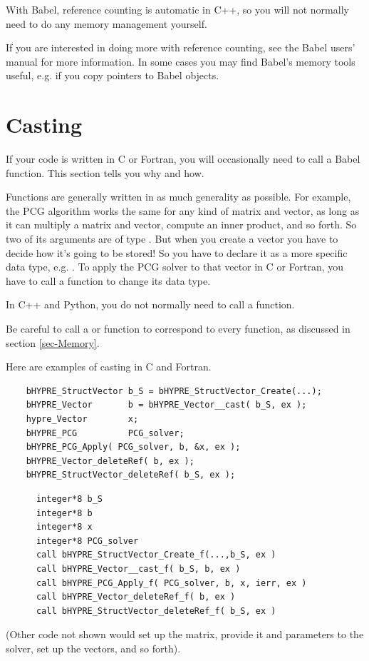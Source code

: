 With Babel, reference counting is automatic in C++, so you will not
normally need to do any memory management yourself.

If you are interested in doing more with reference counting, see the
Babel users' manual for more information.  In some cases you may find
Babel's memory tools useful, e.g. if you copy pointers to Babel
objects.


\section{Casting}
\label{sec-Casting}

If your code is written in C or Fortran, you will occasionally need to
call a Babel  function.  This section tells you why and
how.

Functions are generally written in as much generality as possible.
For example, the PCG algorithm works the same for any kind of matrix
and vector, as long as it can multiply a matrix and vector, compute an
inner product, and so forth.  So two of its arguments are of type
.  But when you create a vector you have to decide
how it's going to be stored!  So you have to declare it as a more
specific data type, e.g. .  To apply the PCG
solver to that vector in C or Fortran, you have to call a 
function to change its data type.

In C++ and Python, you do not normally need to call a 
function.

Be careful to call a  or  function to
correspond to every  function, as discussed in section
\ref{sec-Memory}.

Here are examples of casting in C and Fortran.
\begin{verbatim}
    bHYPRE_StructVector b_S = bHYPRE_StructVector_Create(...);
    bHYPRE_Vector       b = bHYPRE_Vector__cast( b_S, ex );
    hypre_Vector        x;
    bHYPRE_PCG          PCG_solver;
    bHYPRE_PCG_Apply( PCG_solver, b, &x, ex );
    bHYPRE_Vector_deleteRef( b, ex );
    bHYPRE_StructVector_deleteRef( b_S, ex );
\end{verbatim}
\begin{verbatim}
      integer*8 b_S
      integer*8 b
      integer*8 x
      integer*8 PCG_solver
      call bHYPRE_StructVector_Create_f(...,b_S, ex )
      call bHYPRE_Vector__cast_f( b_S, b, ex )
      call bHYPRE_PCG_Apply_f( PCG_solver, b, x, ierr, ex )
      call bHYPRE_Vector_deleteRef_f( b, ex )
      call bHYPRE_StructVector_deleteRef_f( b_S, ex )
\end{verbatim}
(Other code not shown would set up the matrix, provide it and
parameters to the solver, set up the vectors, and so forth).

